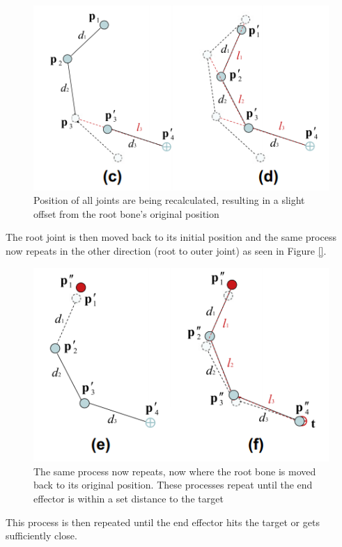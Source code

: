 \begin{figure}[hbtp]
\centering
\includegraphics[width=\textwidth]{cd.PNG}
\caption{Position of all joints are being recalculated, resulting in a slight offset from the root bone's original position}
\end{figure}

The root joint is then moved back to its initial position and the same process now repeats in the other direction (root to outer joint) as seen in Figure \ref{}.

\begin{figure}[hbtp]
 \centering
 \includegraphics[width=\textwidth]{ef.PNG}
 \caption{The same process now repeats, now where the root bone is moved back to its original position. These processes repeat until the end effector is within a set distance to the target}
 \end{figure}
  
This process is then repeated until the end effector hits the target or gets sufficiently close. 

